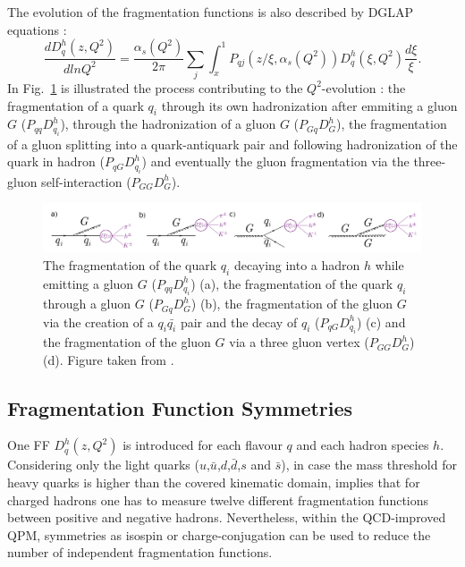 The evolution of the fragmentation functions is also described by DGLAP equations \cite{Dokshitser, GL1, GL2, AP} :
%
\begin{equation}
  \frac{dD_q^h(z,Q^2)}{dlnQ^2} = \frac{\alpha_s(Q^2)}{2\pi}\sum\limits_j\int_{x}^{1}P_{qj}\left(z/\xi,\alpha_s(Q^2)\right)D_q^h(\xi,Q^2)\frac{d\xi}{\xi}.
\end{equation}
%
In Fig.~\ref{pic:QuarkFrag} is illustrated the process contributing to the $Q^2$-evolution : the fragmentation of a quark $q_i$ through its own hadronization after emmiting a gluon $G$ ($P_{qq}D_{q_i}^h$), through the hadronization of a gluon $G$ ($P_{Gq}D_{G}^h$), the fragmentation of a gluon splitting into a quark-antiquark pair and following hadronization of the quark in hadron ($P_{qG}D_{q_i}^h$) and eventually the gluon fragmentation via the three-gluon self-interaction ($P_{GG}D_{G}^h$).

\begin{figure}[!h]
  \centering
	\includegraphics[scale=0.45]{./gfx/QuarkFrag.png}
	\caption{The fragmentation of the quark $q_i$ decaying into a hadron $h$ while emitting a gluon $G$ ($P_{qq}D^h_{q_{i}}$) (a), the fragmentation of the quark $q_i$ through a gluon $G$ ($P_{Gq}D^h_{G}$) (b), the fragmentation of the gluon $G$ via the creation of a $q_i \bar{q_i}$ pair and the decay of $q_i$ ($P_{qG}D^h_{q_{i}}$) (c) and the fragmentation of the gluon $G$ via a three gluon vertex ($P_{GG}D^h_{G}$) (d). Figure taken from \cite{Uematsu}.}
	\label{pic:QuarkFrag}
\end{figure}

\subsection{Fragmentation Function Symmetries}

One FF $D^h_q(z,Q^2)$ is introduced for each flavour $q$ and each hadron species $h$. Considering only the light quarks ($u$,$\bar{u}$,$d$,$\bar{d}$,$s$ and $\bar{s}$), in case the mass threshold for heavy quarks is higher than the covered kinematic domain, implies that for charged hadrons one has to measure twelve different fragmentation functions between positive and negative hadrons. Nevertheless, within the QCD-improved QPM, symmetries as isospin or charge-conjugation can be used to reduce the number of independent fragmentation functions.

